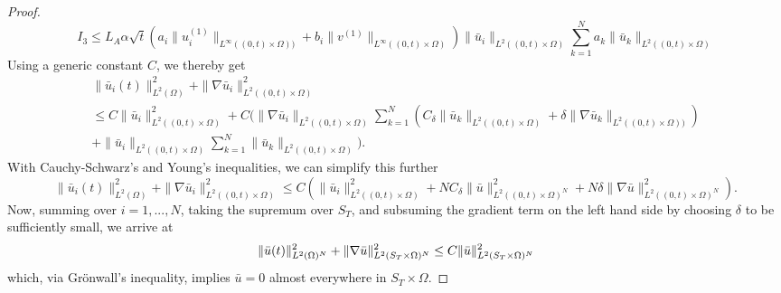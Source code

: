\documentclass[10pt,a4paper]{amsart}
\begin{document}
\begin{proof}
%
\begin{equation}\label{eq:estimate_I3}
I_3
\leq L_A\alpha\sqrt{t}\left(a_i\|u_i^{(1)}\|_{L^\infty((0,t)\times\Omega))}+ b_i\|v^{(1)}\|_{L^\infty((0,t)\times\Omega)}\right)\|\bar{u}_i\|_{L^2((0,t)\times\Omega)}\sum_{k=1}^N a_k\|\bar{u}_k\|_{L^2((0,t)\times\Omega)}
\end{equation}
%
Using a generic constant $C$, we thereby get
%
%
\begin{multline*}
\|\bar{u}_i(t)\|_{L^2(\Omega)}^2+\|\nabla\bar{u}_i\|_{L^2((0,t)\times\Omega)}^2\\
\leq C\|\bar{u}_i\|_{L^2((0,t)\times\Omega)}^2
+C\bigg(\|\nabla\bar{u}_i\|_{L^2((0,t)\times\Omega)}\sum_{k=1}^N\left(C_\delta\|\bar{u}_k\|_{L^{2}((0,t)\times\Omega)}+\delta\|\nabla\bar{u}_k\|_{L^{2}((0,t)\times\Omega))}\right)\\
+\|\bar{u}_i\|_{L^2((0,t)\times\Omega)}\sum_{k=1}^N\|\bar{u}_k\|_{L^2((0,t)\times\Omega)}\bigg).
\end{multline*}
%
With Cauchy-Schwarz's and Young's inequalities, we can simplify this further 
%
\begin{equation*}
\|\bar{u}_i(t)\|_{L^2(\Omega)}^2+\|\nabla\bar{u}_i\|_{L^2((0,t)\times\Omega)}^2
\leq C\left(\|\bar{u}_i\|_{L^2((0,t)\times\Omega)}^2
+NC_\delta\|\bar{u}\|^2_{L^{2}((0,t)\times\Omega)^N}+N\delta\|\nabla\bar{u}\|^2_{L^{2}((0,t)\times\Omega)^N}\right).
\end{equation*}
%
Now, summing over $i=1,...,N$, taking the supremum over $S_T$, and subsuming the gradient term on the left hand side by choosing $\delta$ to be sufficiently small, we arrive at
%
\[
\|\bar{u}(t)\|_{L^2(\Omega)^N}^2+\|\nabla\bar{u}\|_{L^2(S_T\times\Omega)^N}^2\\
\leq C\|\bar{u}\|^2_{L^2(S_T\times\Omega)^N}
\]
%
which, via Grönwall's inequality, implies $\bar{u}=0$ almost everywhere in $S_T\times\Omega$.
\end{proof}
\end{document}

